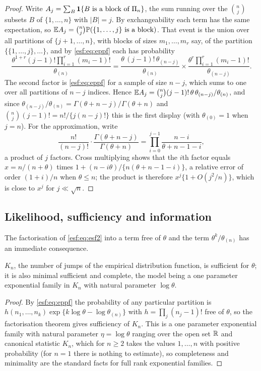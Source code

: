 \begin{proof}
Write $A_j = \sum_{B} \mathbf{1}\{B \text{ is a block of } \Pi_n\}$, the sum running over the
$\binom{n}{j}$ subsets $B$ of $\{1,\dots,n\}$ with $|B| = j$. By exchangeability each
term has the same expectation, so $\mathbb{E} A_j = \binom{n}{j} \mathbb{P}(\{1,\dots,j\} \text{ is a
block})$. That event is the union over all partitions of $\{j+1,\dots,n\}$, with
blocks of sizes $m_1,\dots,m_r$ say, of the partition $\{\{1,\dots,j\}, \dots\}$, and
by \eqref{esf:eq:eppf} each has probability
\[
\frac{\theta^{1+r} (j-1)! \prod_{i=1}^{r} (m_i - 1)!}{\theta_{(n)}}
= \frac{\theta \, (j-1)! \, \theta_{(n-j)}}{\theta_{(n)}}
\times \frac{\theta^{r} \prod_{i=1}^{r}(m_i-1)!}{\theta_{(n-j)}} .
\]
The second factor is \eqref{esf:eq:eppf} for a sample of size $n-j$, which sums to
one over all partitions of $n - j$ indices. Hence
$\mathbb{E} A_j = \binom{n}{j} (j-1)! \, \theta \, \theta_{(n-j)}/\theta_{(n)}$, and since
$\theta_{(n-j)}/\theta_{(n)} = \Gamma(\theta+n-j)/\Gamma(\theta+n)$ and
$\binom{n}{j}(j-1)! = n!/\{j (n-j)!\}$ this is the first display (with
$\theta_{(0)} = 1$ when $j = n$). For the approximation, write
\[
\frac{n!}{(n-j)!} \cdot \frac{\Gamma(\theta+n-j)}{\Gamma(\theta+n)}
= \prod_{i=0}^{j-1} \frac{n - i}{\theta + n - 1 - i} ,
\]
a product of $j$ factors. Cross multiplying shows that the $i$th factor equals
$x = n/(n+\theta)$ times $1 + (n - i\theta)/\{n(\theta+n-1-i)\}$, a relative error of
order $(1+i)/n$ when $\theta \le n$; the product is therefore
$x^{j}\{1 + O(j^2/n)\}$, which is close to $x^j$ for $j \ll \sqrt{n}$.
\end{proof}

\subsection{Likelihood, sufficiency and information}
\label{esf:sec:like}

The factorisation of \eqref{esf:eq:esf2} into a term free of $\theta$ and the term
$\theta^{k}/\theta_{(n)}$ has an immediate consequence.

\begin{corollary}[Sufficiency]
\label{esf:cor:suff}
$K_n$, the number of jumps of the empirical distribution function, is sufficient for
$\theta$; it is also minimal sufficient and complete, the model being a one parameter
exponential family in $K_n$ with natural parameter $\log \theta$.
\end{corollary}

\begin{proof}
By \eqref{esf:eq:eppf} the probability of any particular partition is
$h(n_1,\dots,n_k) \exp\{k \log\theta - \log \theta_{(n)}\}$ with
$h = \prod_j (n_j - 1)!$ free of $\theta$, so the factorisation theorem gives
sufficiency of $K_n$. This is a one parameter exponential family with natural
parameter $\eta = \log \theta$ ranging over the open set $\mathbb{R}$ and canonical statistic
$K_n$, which for $n \ge 2$ takes the values $1,\dots,n$ with positive probability
(for $n = 1$ there is nothing to estimate), so completeness and minimality are the standard facts for full rank
exponential families.
\end{proof}

